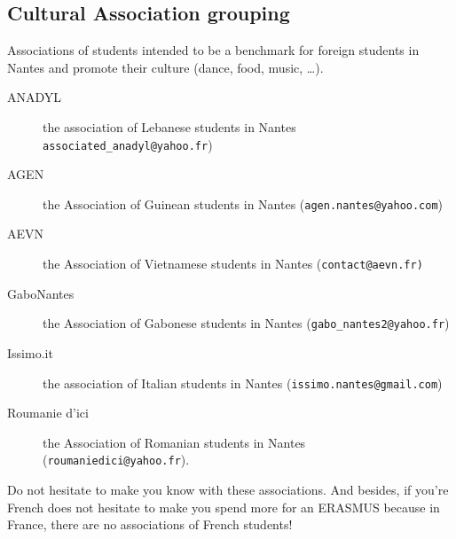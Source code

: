\subsection{Cultural Association grouping}
Associations of students intended to be a benchmark for foreign students in Nantes and promote their culture (dance, food, music, \dots).
\begin{description}
    \item[ANADYL] the association of Lebanese students in Nantes \texttt{associated\_anadyl@yahoo.fr})
    \item[AGEN] the Association of Guinean students in Nantes (\texttt{agen.nantes@yahoo.com})
    \item[AEVN]  the Association of Vietnamese students in Nantes (\texttt{contact@aevn.fr)}
    \item[GaboNantes] the Association of Gabonese students in Nantes (\texttt{gabo\_nantes2@yahoo.fr})
    \item[Issimo.it] the association of Italian students in Nantes (\texttt{issimo.nantes@gmail.com})
    \item[Roumanie d'ici] the Association of Romanian students in Nantes (\texttt{roumaniedici@yahoo.fr}).
\end{description}
Do not hesitate to make you know with these associations.
And besides, if you're French does not hesitate to make you spend more for an ERASMUS because in France, there are no associations of French students!
